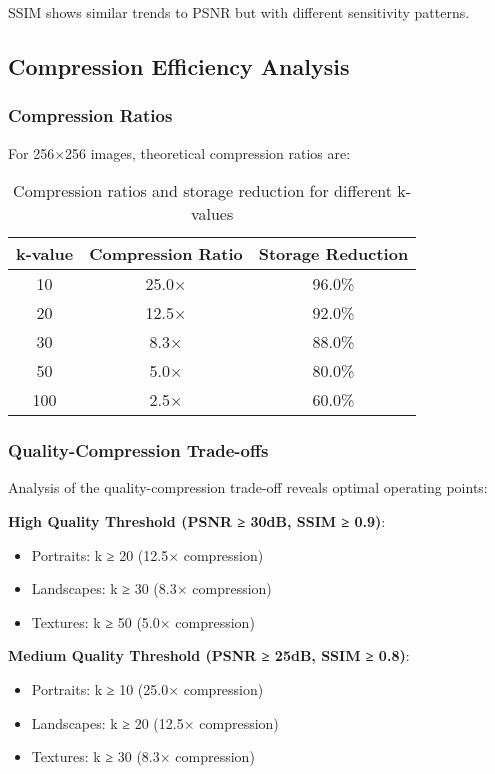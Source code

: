 \documentclass[12pt,a4paper]{article}
\begin{document}
SSIM shows similar trends to PSNR but with different sensitivity patterns.

\subsection{Compression Efficiency Analysis}

\subsubsection{Compression Ratios}

For 256×256 images, theoretical compression ratios are:

\begin{table}[H]
\centering
\begin{tabular}{@{}ccc@{}}
\toprule
k-value & Compression Ratio & Storage Reduction \\
\midrule
10 & 25.0× & 96.0\% \\
20 & 12.5× & 92.0\% \\
30 & 8.3× & 88.0\% \\
50 & 5.0× & 80.0\% \\
100 & 2.5× & 60.0\% \\
\bottomrule
\end{tabular}
\caption{Compression ratios and storage reduction for different k-values}
\label{tab:compression_ratios}
\end{table}

\subsubsection{Quality-Compression Trade-offs}

Analysis of the quality-compression trade-off reveals optimal operating points:

\textbf{High Quality Threshold (PSNR ≥ 30dB, SSIM ≥ 0.9)}:
\begin{itemize}
    \item Portraits: k ≥ 20 (12.5× compression)
    \item Landscapes: k ≥ 30 (8.3× compression)  
    \item Textures: k ≥ 50 (5.0× compression)
\end{itemize}

\textbf{Medium Quality Threshold (PSNR ≥ 25dB, SSIM ≥ 0.8)}:
\begin{itemize}
    \item Portraits: k ≥ 10 (25.0× compression)
    \item Landscapes: k ≥ 20 (12.5× compression)
    \item Textures: k ≥ 30 (8.3× compression)
\end{itemize}
\end{document}
